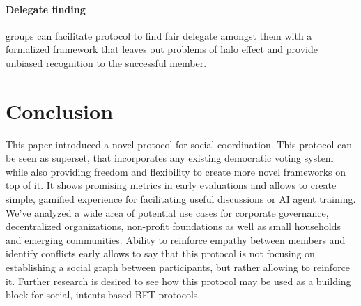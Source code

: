 \documentclass{article}
\begin{document}
\begin{CJK}{UTF8}{gbsn}
\begin{multicols}{2}
        \paragraph{Delegate finding} groups can facilitate protocol to find fair delegate amongst them with a formalized framework that leaves out problems of halo effect\cite{Verhulst2010} and provide unbiased recognition to the successful member.


    \end{multicols}
    \section{Conclusion}

    This paper introduced a novel protocol for social coordination. This protocol can be seen as superset, that incorporates any existing democratic voting system while also providing freedom and flexibility to create more novel frameworks on top of it.
    It shows promising metrics in early evaluations and allows to create simple, gamified experience for facilitating useful discussions or AI agent training.
    We've analyzed a wide area of potential use cases for corporate governance, decentralized organizations, non-profit foundations as well as small households and emerging communities.
    Ability to reinforce empathy between members and identify conflicts early allows to say that this protocol is not focusing on establishing a social graph between participants, but rather allowing to reinforce it.
    Further research is desired to see how this protocol may be used as a building block for social, intents based BFT protocols.


    \clearpage

    
    

    \clearpage\end{CJK}
\end{document}
